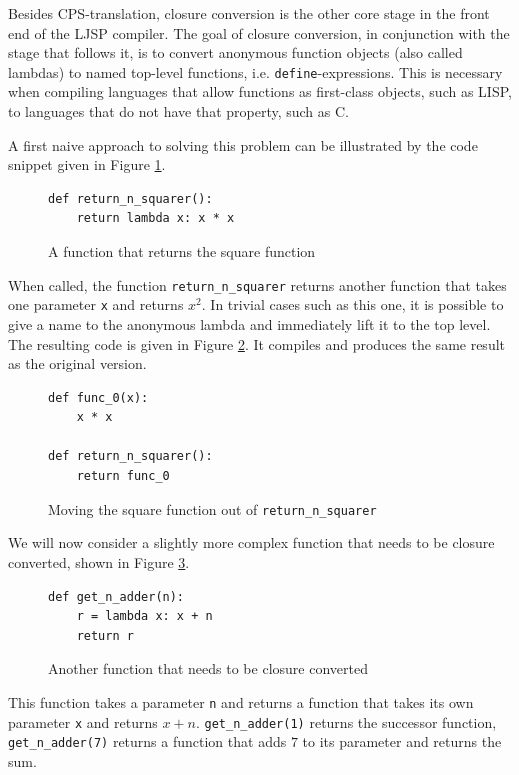 \documentclass[11pt]{report}
\begin{document}
Besides CPS-translation, closure conversion is the other core stage in the front end of the LJSP compiler. The goal of closure conversion, in conjunction with the stage that follows it, is to convert anonymous function objects (also called lambdas) to named top-level functions, i.e. \texttt{define}-expressions. This is necessary when compiling languages that allow functions as first-class objects, such as LISP, to languages that do not have that property, such as C.

A first naive approach to solving this problem can be illustrated by the code snippet given in Figure \ref{cc1}.

\begin{figure}[h!]
\begin{lstlisting}
def return_n_squarer():
    return lambda x: x * x
\end{lstlisting}
\caption{A function that returns the square function}
\label{cc1}
\end{figure}

When called, the function \texttt{return_n_squarer} returns another function that takes one parameter \texttt{x} and returns $x^2$. In trivial cases such as this one, it is possible to give a name to the anonymous lambda and immediately lift it to the top level. The resulting code is given in Figure \ref{cc2}. It compiles and produces the same result as the original version.

\begin{figure}[h!]
\begin{lstlisting}
def func_0(x):
    x * x
    
def return_n_squarer():
    return func_0
\end{lstlisting}
\caption{Moving the square function out of \texttt{return_n_squarer}}
\label{cc2}
\end{figure}

We will now consider a slightly more complex function that needs to be closure converted, shown in Figure \ref{cc3}.

\begin{figure}[ht]
\begin{lstlisting}
def get_n_adder(n):
    r = lambda x: x + n
    return r
\end{lstlisting}
\caption{Another function that needs to be closure converted}
\label{cc3}
\end{figure}

This function takes a parameter \texttt{n} and returns a function that takes its own parameter \texttt{x} and returns $x+n$. \texttt{get_n_adder(1)} returns the successor function, \texttt{get_n_adder(7)} returns a function that adds $7$ to its parameter and returns the sum.
\end{document}
